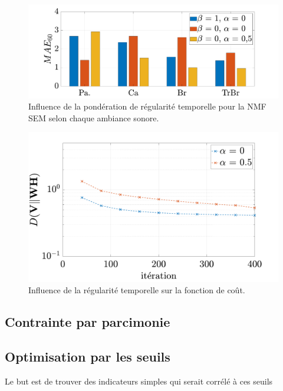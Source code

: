 \begin{figure}[h!]
\centering
\includegraphics[width=.9\linewidth]{./figures/resultats/grafic_smooth_bar.pdf}
\caption{Influence de la pondération de régularité temporelle pour la NMF SEM selon chaque ambiance sonore.}
\end{figure}

\begin{figure}[h]
\centering
\includegraphics[width=.8\linewidth]{./figures/resultats/grafic_smooth_cost_beta0.pdf}
\caption{Influence de la régularité temporelle sur la fonction de coût.}
\end{figure}


\subsection{Contrainte par parcimonie}



\subsection{Optimisation par les seuils}



Le but est de trouver des indicateurs simples qui serait corrélé à ces seuils


%